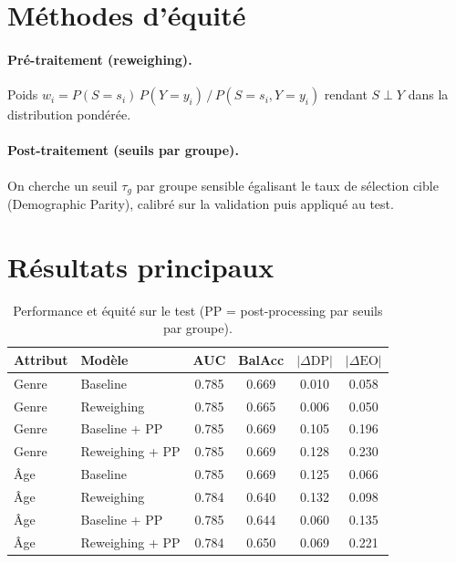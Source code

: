 \documentclass[11pt, a4paper]{article}
\begin{document}
\section{M\'ethodes d'\'equit\'e}

\paragraph{Pr\'e-traitement (reweighing).} Poids $w_i = P(S{=}s_i)\,P(Y{=}y_i)\,/\,P(S{=}s_i, Y{=}y_i)$ rendant $S \perp Y$ dans la distribution pond\'er\'ee.

\paragraph{Post-traitement (seuils par groupe).} On cherche un seuil $\tau_g$ par groupe sensible \'egalisant le taux de s\'election cible (Demographic Parity), calibr\'e sur la validation puis appliqu\'e au test.

\section{R\'esultats principaux}

\begin{table}[ht]
\centering
\small
\begin{tabular}{llcccc}
\toprule
\textbf{Attribut} & \textbf{Mod\`ele} & \textbf{AUC} & \textbf{BalAcc} & $|\Delta\text{DP}|$ & $|\Delta\text{EO}|$ \\
\midrule
Genre & Baseline        & 0.785 & 0.669 & 0.010 & 0.058 \\
Genre & Reweighing      & 0.785 & 0.665 & 0.006 & 0.050 \\
Genre & Baseline + PP   & 0.785 & 0.669 & 0.105 & 0.196 \\
Genre & Reweighing + PP & 0.785 & 0.669 & 0.128 & 0.230 \\
\midrule
\^Age  & Baseline        & 0.785 & 0.669 & 0.125 & 0.066 \\
\^Age  & Reweighing      & 0.784 & 0.640 & 0.132 & 0.098 \\
\^Age  & Baseline + PP   & 0.785 & 0.644 & 0.060 & 0.135 \\
\^Age  & Reweighing + PP & 0.784 & 0.650 & 0.069 & 0.221 \\
\bottomrule
\end{tabular}
\caption{Performance et \'equit\'e sur le test (PP = post-processing par seuils par groupe).}
\label{tab:results}
\end{table}
\end{document}
